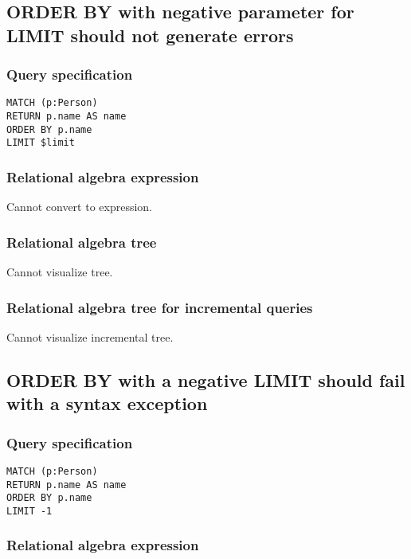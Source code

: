 \subsection{ORDER BY with negative parameter for LIMIT should not generate errors}

\subsubsection*{Query specification}

\begin{lstlisting}
MATCH (p:Person)
RETURN p.name AS name
ORDER BY p.name
LIMIT $limit
\end{lstlisting}

\subsubsection*{Relational algebra expression}

Cannot convert to expression.

\subsubsection*{Relational algebra tree}

Cannot visualize tree.

\subsubsection*{Relational algebra tree for incremental queries}

Cannot visualize incremental tree.

\subsection{ORDER BY with a negative LIMIT should fail with a syntax exception}

\subsubsection*{Query specification}

\begin{lstlisting}
MATCH (p:Person)
RETURN p.name AS name
ORDER BY p.name
LIMIT -1
\end{lstlisting}

\subsubsection*{Relational algebra expression}


